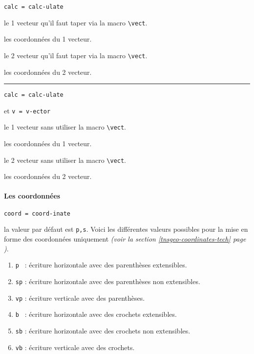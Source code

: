 \documentclass[12pt,a4paper]{article}
\newcommand\env[1]{\texttt{#1}}
\newcommand\macro[1]{\env{\textbackslash{}#1}}
\theoremstyle{definition}
\newcommand\separation{
	\medskip
	\hfill\rule{0.5\textwidth}{0.75pt}\hfill
	\medskip
}
\newcommand\mwhyprefix[2]{%
	\texttt{#1 = #1-#2}%
}
\begin{document}
  \hfill \mwhyprefix{calc}{ulate}


 le 1\ier{} vecteur qu'il faut taper via la macro \macro{vect}.

 les coordonnées du 1\ier{} vecteur.

 le 2\ieme{} vecteur qu'il faut taper via la macro \macro{vect}.

 les coordonnées du 2\ieme{} vecteur.


\separation


  \hfill \mwhyprefix{calc}{ulate}
                                     et \mwhyprefix{v}{ector}


 le 1\ier{} vecteur sans utiliser la macro \macro{vect}.

 les coordonnées du 1\ier{} vecteur.

 le 2\ieme{} vecteur sans utiliser la macro \macro{vect}.

 les coordonnées du 2\ieme{} vecteur.



\paragraph{Les coordonnées}



  \hfill \mwhyprefix{coord}{inate}

\IDoption{} la valeur par défaut est \verb+p,s+. 
            Voici les différentes valeurs possibles pour la mise en forme des coordonnées uniquement \emph{(voir la section \ref{tnsgeo-coordinates-tech} page \pageref{tnsgeo-coordinates-tech})}.
\begin{enumerate}
	\item \verb+p + : écriture horizontale avec des parenthèses extensibles.

	\item \verb+sp+ : écriture horizontale avec des parenthèses non extensibles.

	\item \verb+vp+ : écriture verticale avec des parenthèses.

	\medskip
	
	\item \verb+b + : écriture horizontale avec des crochets extensibles.

	\item \verb+sb+ : écriture horizontale avec des crochets non extensibles.

	\item \verb+vb+ : écriture verticale avec des crochets.
\end{enumerate}
\end{document}
